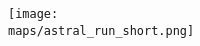 \begin{multicols}{2}


\begin{center}
  \vspace*{\fill}
  \vspace*{\fill}
  \texttt{[image: \\maps/astral\_run\_short.png]}
  \vspace*{\fill}
\end{center}

\end{multicols}\\
